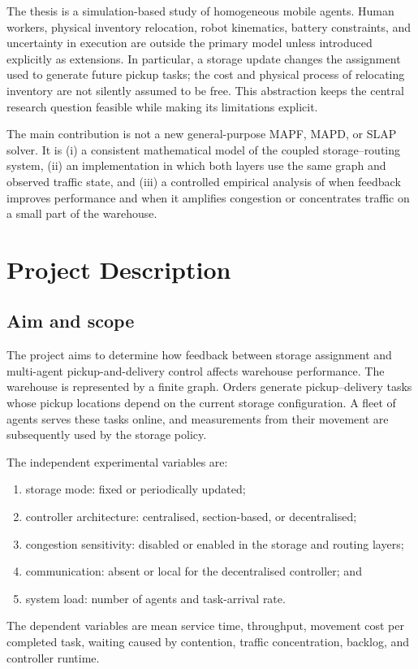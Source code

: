 \documentclass[../main.tex]{subfiles}
\begin{document}
The thesis is a simulation-based study of homogeneous mobile agents. Human
workers, physical inventory relocation, robot kinematics, battery constraints,
and uncertainty in execution are outside the primary model unless introduced
explicitly as extensions. In particular, a storage update changes the
assignment used to generate future pickup tasks; the cost and physical process
of relocating inventory are not silently assumed to be free. This abstraction
keeps the central research question feasible while making its limitations
explicit.

The main contribution is not a new general-purpose MAPF, MAPD, or SLAP solver.
It is (i) a consistent mathematical model of the coupled storage--routing
system, (ii) an implementation in which both layers use the same graph and
observed traffic state, and (iii) a controlled empirical analysis of when
feedback improves performance and when it amplifies congestion or concentrates
traffic on a small part of the warehouse.

\section{Project Description}
\label{sec:project-description}

\subsection{Aim and scope}

The project aims to determine how feedback between storage assignment and
multi-agent pickup-and-delivery control affects warehouse performance. The
warehouse is represented by a finite graph. Orders generate pickup--delivery
tasks whose pickup locations depend on the current storage configuration. A
fleet of agents serves these tasks online, and measurements from their movement
are subsequently used by the storage policy.

The independent experimental variables are:
\begin{enumerate}
  \item storage mode: fixed or periodically updated;
  \item controller architecture: centralised, section-based, or decentralised;
  \item congestion sensitivity: disabled or enabled in the storage and routing
        layers;
  \item communication: absent or local for the decentralised controller; and
  \item system load: number of agents and task-arrival rate.
\end{enumerate}
The dependent variables are mean service time, throughput, movement cost per
completed task, waiting caused by contention, traffic concentration, backlog,
and controller runtime.
\end{document}
